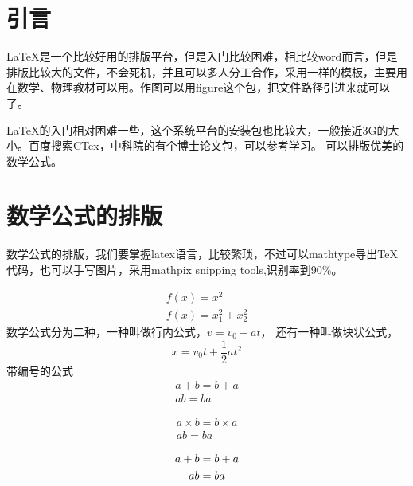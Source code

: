 \documentclass[UTF8,twocolumn, a4paper]{ctexart}
\begin{document}
    \section{引言}
        \LaTeX 是一个比较好用的排版平台，但是入门比较困难，相比较word而言，但是排版比较大的文件，不会死机，并且可以多人分工合作，采用一样的模板，主要用在数学、物理教材可以用。作图可以用figure这个包，把文件路径引进来就可以了。

        \LaTeX 的入门相对困难一些，这个系统平台的安装包也比较大，一般接近3G的大小。百度搜索CTex，中科院的有个博士论文包，可以参考学习。
        可以排版优美的数学公式。
    \section{数学公式的排版}
        数学公式的排版，我们要掌握latex语言，比较繁琐，不过可以mathtype导出TeX代码，也可以手写图片，采用mathpix snipping tools,识别率到90\%。

        \begin{gather*}
            f(x) = x ^ 2 \\
            f(x) = x_1^2 + {x}_{2}^{2}
        \end{gather*}
        数学公式分为二种，一种叫做行内公式，$v=v_0+at$，
        还有一种叫做块状公式，
        \[
            x=v_0 t+\frac{1}{2} at^2   
        \]
        带编号的公式
        \begin{gather}%
            a+b=b+a\\
            ab=ba
        \end{gather}
         
        \begin{gather*}%
        a \times b=b \times a\\
        ab=ba   
        \end{gather*}
         
        \begin{gather}%
        a+b=b+a \notag \\%
        ab=ba   \notag %
        \end{gather}
         
         
         
\end{document}
